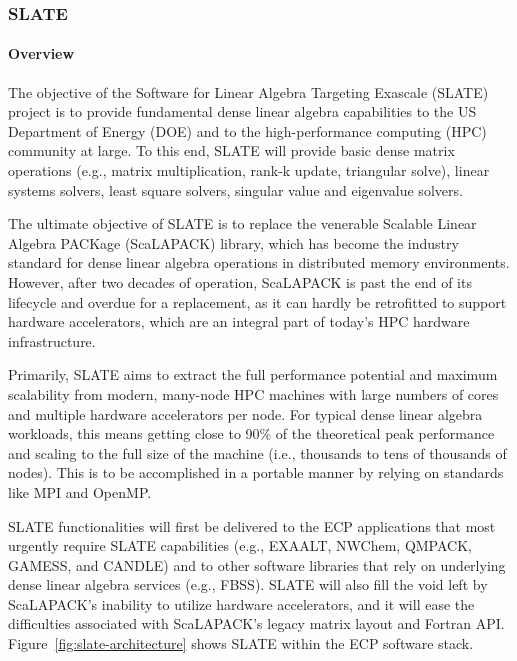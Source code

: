 \subsubsection{ SLATE}\label{subsubsect:slate}


\paragraph{Overview}

The objective of the Software for Linear Algebra Targeting Exascale 
(SLATE) project is to provide fundamental dense linear algebra capabilities
to the US Department of Energy (DOE) and to the high-performance 
computing (HPC) community at large.
To this end, SLATE will provide basic dense matrix operations (e.g., matrix multiplication,
rank-k update, triangular solve),
linear systems solvers, least square solvers, singular value
and eigenvalue solvers.

The ultimate objective of SLATE is to replace the
venerable Scalable Linear Algebra PACKage (ScaLAPACK) library, 
which has become the industry standard
for dense linear algebra operations in distributed memory environments.
However, after two decades of operation, ScaLAPACK is past the end of its lifecycle
and overdue for a replacement, as it can hardly be retrofitted
to support hardware accelerators, which are an integral part of today's HPC
hardware infrastructure.

Primarily, SLATE aims to extract the full performance potential and maximum 
scalability from modern, many-node HPC machines with large numbers of cores
and multiple hardware accelerators per node.
For typical dense linear algebra workloads, this means getting close to 90\% 
of the theoretical peak performance and scaling to the full size of the machine
(i.e., thousands to tens of thousands of nodes).
This is to be accomplished in a portable manner by relying on standards like 
MPI and OpenMP.

SLATE functionalities will first be delivered to the ECP applications
that most urgently require SLATE capabilities 
(e.g., EXAALT, NWChem, QMPACK, GAMESS, and CANDLE)
and to other software libraries 
that rely on underlying dense linear algebra services (e.g., FBSS).
SLATE will also fill the void left by ScaLAPACK's inability to utilize
hardware accelerators, and it will ease the difficulties associated with ScaLAPACK's
legacy matrix layout and Fortran API.
Figure~\ref{fig:slate-architecture} shows SLATE within 
the ECP software stack.

